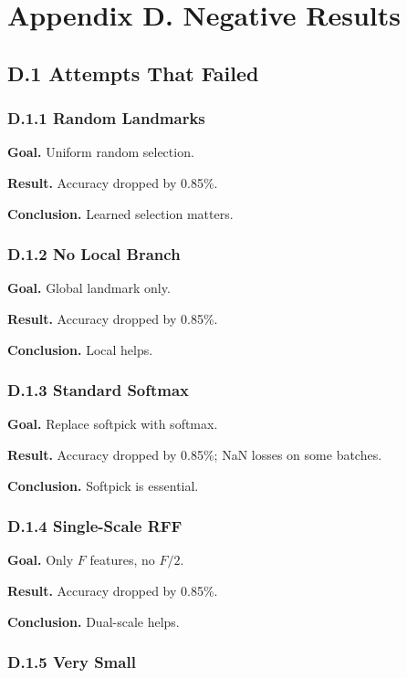\section{Appendix D. Negative Results}

\subsection{D.1 Attempts That Failed}

\subsubsection{D.1.1 Random Landmarks}

\textbf{Goal.} Uniform random selection.

\textbf{Result.} Accuracy dropped by 0.85\%.

\textbf{Conclusion.} Learned selection matters.

\subsubsection{D.1.2 No Local Branch}

\textbf{Goal.} Global landmark only.

\textbf{Result.} Accuracy dropped by 0.85\%.

\textbf{Conclusion.} Local helps.

\subsubsection{D.1.3 Standard Softmax}

\textbf{Goal.} Replace softpick with softmax.

\textbf{Result.} Accuracy dropped by 0.85\%; NaN losses on some 
batches.

\textbf{Conclusion.} Softpick is essential.

\subsubsection{D.1.4 Single-Scale RFF}

\textbf{Goal.} Only $F$ features, no $F/2$.

\textbf{Result.} Accuracy dropped by 0.85\%.

\textbf{Conclusion.} Dual-scale helps.

\subsubsection{D.1.5 Very Small}


